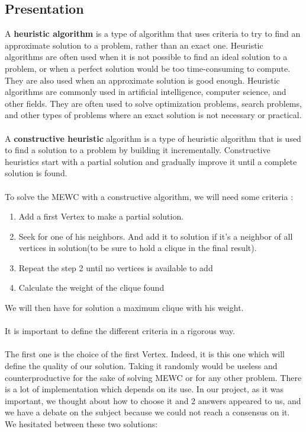 
\subsection{Presentation}

A \textbf{heuristic algorithm} is a type of algorithm that uses criteria to try to find an approximate solution to a problem, rather than an exact one. Heuristic algorithms are often used when it is not possible to find an ideal solution to a problem, or when a perfect solution would be too time-consuming to compute. They are also used when an approximate solution is good enough. Heuristic algorithms are commonly used in artificial intelligence, computer science, and other fields. They are often used to solve optimization problems, search problems, and other types of problems where an exact solution is not necessary or practical.
\\ \\
A \textbf{constructive heuristic} algorithm is a type of heuristic algorithm that is used to find a solution to a problem by building it incrementally. Constructive heuristics start with a partial solution and gradually improve it until a complete solution is found.
\\ \\
To solve the MEWC with a constructive algorithm, we will need some criteria :

\begin{enumerate}
    \item Add a first Vertex to make a partial solution.
    \item Seek for one of his neighbors. And add it to solution if it's a neighbor of all vertices in solution(to be sure to hold a clique in the final result).
    \item Repeat the step 2 until no vertices is available to add
    \item Calculate the weight of the clique found
\end{enumerate}

We will then have for solution a maximum clique with his weight.
\\ \\
It is important to define the different criteria in a rigorous way.
\\ \\
The first one is the choice of the first Vertex. Indeed, it is this one which will define the quality of our solution. Taking it randomly would be useless and counterproductive for the sake of solving MEWC or for any other problem. There is a lot of implementation which depends on its use. In our project, as it was important, we thought about how to choose it and 2 answers appeared to us, and we have a debate on the subject because we could not reach a consensus on it. We hesitated between these two solutions:


